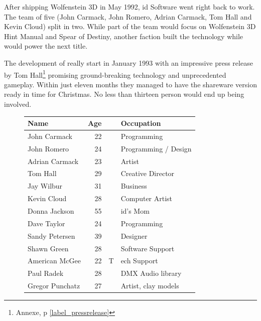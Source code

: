 After shipping Wolfenstein 3D in May 1992, id Software went right back to work. The team of five (John Carmack, John Romero, Adrian Carmack, Tom Hall and Kevin Cloud) split in two. While part of the team would focus on Wolfenstein 3D Hint Manual and Spear of Destiny, another faction built the technology while would power the next title.\\
\par
The development of \doom{} really start in January 1993 with an impressive press release by Tom Hall\protect\footnote{Annexe, p \ref{label_pressrelease}} promising ground-breaking technology and unprecedented gameplay. Within just eleven months they managed to have the shareware version ready in time for Christmas. No less than thirteen person would end up being involved.\\
\par
 \begin{figure}[H]
\centering  
\begin{tabularx}{\textwidth}{L{0.3} R{0.2} L{0.1} L{0.4}  }
  \toprule
  \textbf{Name} &  \textbf{Age} & &\textbf{Occupation} \\
  \toprule 
   John Carmack & 22 &  &Programming\\
   John Romero & 24 &  &Programming / Design\\
   Adrian Carmack & 23 &  &Artist\\
   Tom Hall\protect\footnotemark  & 29 &  &Creative Director\\
   Jay Wilbur & 31 &  &Business\\
   Kevin Cloud& 28 &  &Computer Artist\\
   Donna Jackson & 55 & &id's Mom\\   
   Dave Taylor & 24 & &Programming\\
   Sandy Petersen & 39 & &Designer\\
   Shawn Green & 28 & &Software Support\\
   American McGee & 22 & T&ech Support\\
   Paul Radek & 28 & &DMX Audio library\\
   Gregor Punchatz & 27 & &Artist, clay models\\

     \toprule
\end{tabularx}
\label{fig:Id Software team}
\end{figure}



